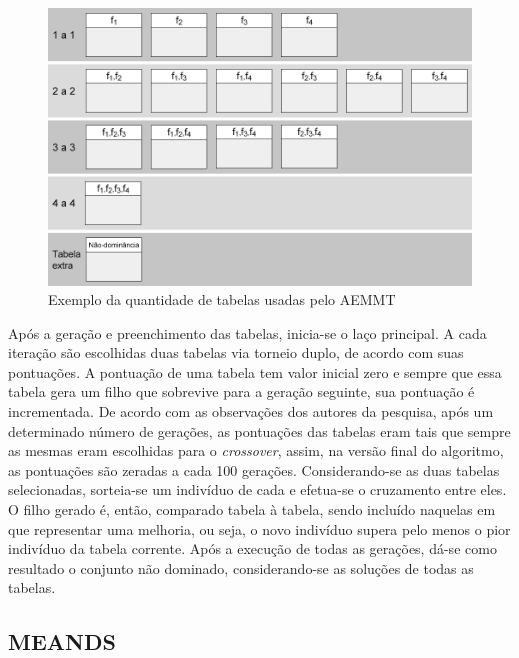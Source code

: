 \begin{figure}[!htbp]
	\centering
	\includegraphics[width=1\textwidth]{cap_otimizacao-multi/figs/aeemt-tabelas}
	\caption{\label{fig_aemmt_tabelas}Exemplo da quantidade de tabelas usadas pelo AEMMT}
\end{figure}

Após a geração e preenchimento das tabelas, inicia-se o laço principal. A cada iteração são escolhidas duas tabelas via torneio duplo, de acordo com suas pontuações. A pontuação de uma tabela tem valor inicial zero e sempre que essa tabela gera um filho que sobrevive para a geração seguinte, sua pontuação é incrementada. De acordo com as observações dos autores da pesquisa, após um determinado número de gerações, as pontuações das tabelas eram tais que sempre as mesmas eram escolhidas para o \textit{crossover}, assim, na versão final do algoritmo, as pontuações são zeradas a cada 100 gerações. Considerando-se as duas tabelas selecionadas, sorteia-se um indivíduo de cada e efetua-se o cruzamento entre eles. O filho gerado é, então, comparado tabela à tabela, sendo incluído naquelas em que representar uma melhoria, ou seja, o novo indivíduo supera pelo menos o pior indivíduo da tabela corrente. Após a execução de todas as gerações, dá-se como resultado o conjunto não dominado, considerando-se as soluções de todas as tabelas.

\subsection{MEANDS}
\label{section_aemmd}

